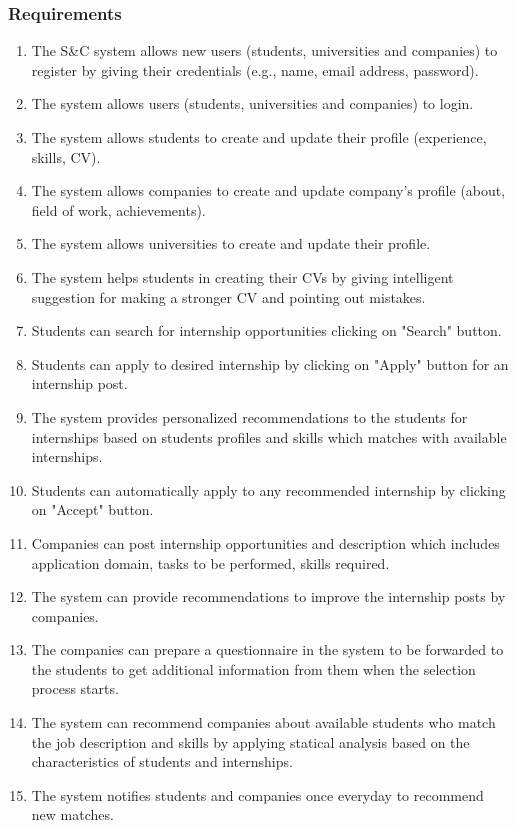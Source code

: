 \subsubsection{Requirements}
\begin{enumerate}[label=R{\arabic*}]
    \item The S\&C system allows new users (students, universities and companies) to register by giving their credentials (e.g., name, email address, password).
    \item The system allows users (students, universities and companies) to login.
    \item The system allows students to create and update their profile (experience, skills, CV).
    \item The system allows companies to create and update company's profile (about, field of work, achievements).
    \item The system allows universities to create and update their profile.
    \item The system helps students in creating their CVs by giving intelligent suggestion for making a stronger CV and pointing out mistakes.
    \item Students can search for internship opportunities clicking on "Search" button.
    \item Students can apply to desired internship by clicking on "Apply" button for an internship post.
    \item The system provides personalized recommendations to the students for internships based on students profiles and skills which matches with available internships.
    \item Students can automatically apply to any recommended internship by clicking on "Accept" button.
    \item Companies can post internship opportunities and description which includes application domain, tasks to be performed, skills required.
    \item The system can provide recommendations to improve the internship posts by companies.
    \item The companies can prepare a questionnaire in the system to be forwarded to the students to get additional information from them when the selection process starts.
    \item The system can recommend companies about available students who match the job description and skills by applying statical analysis based on the characteristics of students and internships.
    \item The system notifies students and companies once everyday to recommend new matches. 

\end{enumerate}

